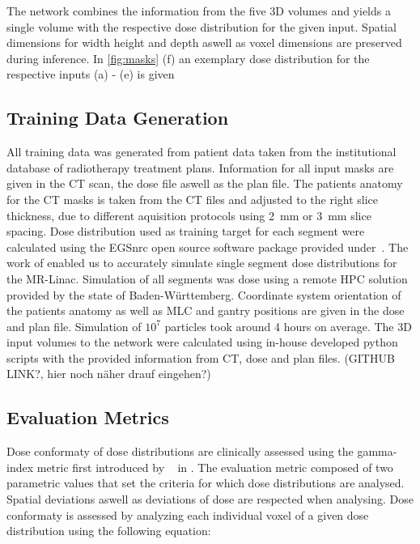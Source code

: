 The network combines the information from the five 3D volumes and yields a single volume with the respective dose distribution for the given input. Spatial dimensions for width height and depth aswell as voxel dimensions are preserved during inference. In \autoref{fig:masks} (f) an exemplary dose distribution for the respective inputs (a) - (e) is given

\subsection{Training Data Generation}

All training data was generated from patient data taken from the institutional database of radiotherapy treatment plans. 
Information for all input masks are given in the CT scan, the dose file aswell as the plan file. 
The patients anatomy for the CT masks is taken from the CT files and adjusted to the right slice thickness, due to different aquisition protocols using 2~mm or 3~mm slice spacing. 
Dose distribution used as training target for each segment were calculated using the EGSnrc open source software package provided under~\cite{noauthor_nrc-cnrcegsnrc_2021}. 
The work of \citeauthor{friedel_development_2019} enabled us to accurately simulate single segment dose distributions for the MR-Linac. 
Simulation of all segments was dose using a remote \ac{HPC} solution provided by the state of Baden-Württemberg. 
Coordinate system orientation of the patients anatomy as well as \ac{MLC} and gantry positions are given in the dose and plan file. 
Simulation of $10^7$ particles took around 4 hours on average.
The 3D input volumes to the network were calculated using in-house developed python scripts with the provided information from CT, dose and plan files. (GITHUB LINK?, hier noch näher drauf eingehen?)

\subsection{Evaluation Metrics}

Dose conformaty of dose distributions are clinically assessed using the gamma-index metric first introduced by \citeauthor{low_technique_1998}~\cite{low_technique_1998} in \citeyear{low_technique_1998}. The evaluation metric composed of two parametric values that set the criteria for which dose distributions are analysed. Spatial deviations aswell as deviations of dose are respected when analysing. Dose conformaty is assessed by analyzing each individual voxel of a given dose distribution using the following equation:


